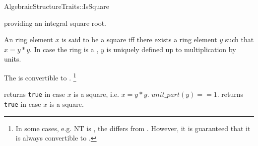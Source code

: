 

\begin{ccRefConcept}{AlgebraicStructureTraits::IsSquare}

\ccDefinition

 providing an integral square root. 

An ring element $x$ is said to be a square iff there exists a ring element $y$ such
that $x= y*y$. In case the ring is a ,
$y$ is uniquely defined up to multiplication by units. \\


\ccRefines 


\ccTypes

{}
{The  is convertible to . 
 \footnote{In some cases, e.g. NT is , the 
  differs from . 
 However, it is guaranteed that it is always convertible to .}
}\ccGlue
{}\ccGlue
{}

\ccOperations

        { returns {\tt true} in case $x$ is a square, i.e. $x = y*y$.
          \ccPostcond $unit\_part(y) == 1$. 
        }
        { returns {\tt true} in case $x$ is a square.
        }


\ccSeeAlso


\end{ccRefConcept} 